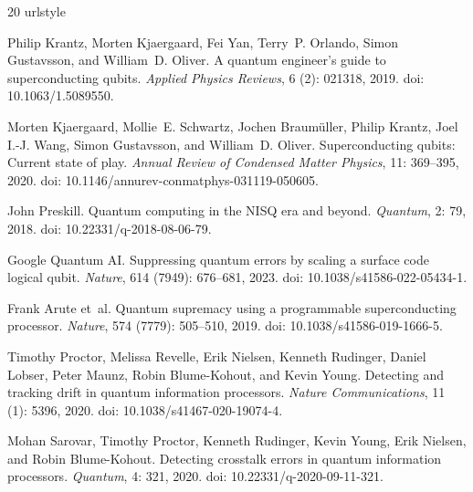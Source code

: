 \documentclass[
  aps,
  prresearch,
  reprint,
  amsmath,
  amssymb,
  nofootinbib,
  floatfix,
]{revtex4-2}
\begin{document}
\begin{thebibliography}{20}
\providecommand{\natexlab}[1]{#1}
\providecommand{\url}[1]{\texttt{#1}}
\expandafter\ifx\csname urlstyle\endcsname\relax
  \providecommand{\doi}[1]{doi: #1}\else
  \providecommand{\doi}{doi: \begingroup \urlstyle{rm}\Url}\fi

Philip Krantz, Morten Kjaergaard, Fei Yan, Terry~P. Orlando, Simon Gustavsson,
  and William~D. Oliver.
\newblock A quantum engineer's guide to superconducting qubits.
\newblock \emph{Applied Physics Reviews}, 6 (2): 021318, 2019.
\newblock \doi{10.1063/1.5089550}.

Morten Kjaergaard, Mollie~E. Schwartz, Jochen Braum{\"u}ller, Philip Krantz,
  Joel I.-J. Wang, Simon Gustavsson, and William~D. Oliver.
\newblock Superconducting qubits: Current state of play.
\newblock \emph{Annual Review of Condensed Matter Physics}, 11:
  369--395, 2020.
\newblock \doi{10.1146/annurev-conmatphys-031119-050605}.

John Preskill.
\newblock Quantum computing in the {NISQ} era and beyond.
\newblock \emph{Quantum}, 2: 79, 2018.
\newblock \doi{10.22331/q-2018-08-06-79}.

{Google Quantum AI}.
\newblock Suppressing quantum errors by scaling a surface code logical qubit.
\newblock \emph{Nature}, 614 (7949): 676--681, 2023.
\newblock \doi{10.1038/s41586-022-05434-1}.

Frank Arute et~al.
\newblock Quantum supremacy using a programmable superconducting processor.
\newblock \emph{Nature}, 574 (7779): 505--510, 2019.
\newblock \doi{10.1038/s41586-019-1666-5}.

Timothy Proctor, Melissa Revelle, Erik Nielsen, Kenneth Rudinger, Daniel Lobser,
  Peter Maunz, Robin Blume-Kohout, and Kevin Young.
\newblock Detecting and tracking drift in quantum information processors.
\newblock \emph{Nature Communications}, 11 (1): 5396, 2020.
\newblock \doi{10.1038/s41467-020-19074-4}.

Mohan Sarovar, Timothy Proctor, Kenneth Rudinger, Kevin Young, Erik Nielsen, and
  Robin Blume-Kohout.
\newblock Detecting crosstalk errors in quantum information processors.
\newblock \emph{Quantum}, 4: 321, 2020.
\newblock \doi{10.22331/q-2020-09-11-321}.


\end{thebibliography}
\end{document}
